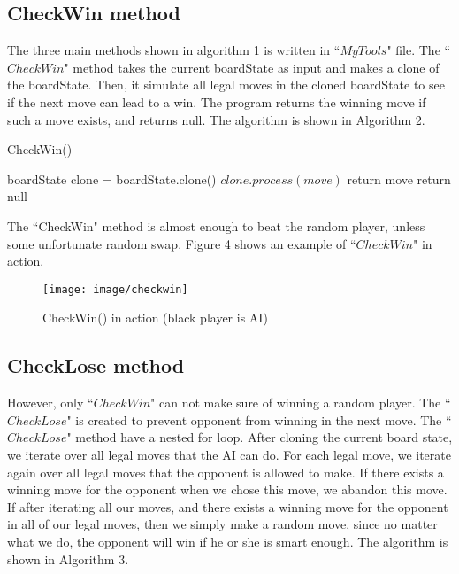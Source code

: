 \documentclass[a4paper,titlepage]{article}
\begin{document}
\subsection{\small{CheckWin method}}
The three main methods shown in algorithm 1 is written in ``$MyTools$" file. The ``$CheckWin$" method takes the current boardState as input and makes a clone of the boardState. Then, it simulate all legal moves in the cloned boardState to see if the next move can lead to a win. The program returns the winning move if such a move exists, and returns null. The algorithm is shown in Algorithm 2.

\begin{algorithm}[H]
    \begin{algorithmic}[1]
    \small
        \caption{CheckWin()} \label{algorithm: win}
        \Require boardState
        \State clone = boardState.clone()
        \State $clone.process(move)$
        \State return move
        \EndIf
        \EndFor
        \State return null
        \end{algorithmic}
\end{algorithm}

The ``CheckWin" method is almost enough to beat the random player, unless some unfortunate random swap. Figure 4 shows an example of ``$CheckWin$" in action.

\begin{figure}[!htb]
  \centering
  \texttt{[image: image/checkwin]}
  \caption{CheckWin() in action (black player is AI)}
\end{figure}


\subsection{\small{CheckLose method}}
However, only ``$CheckWin$" can not make sure of winning a random player. The ``$CheckLose$" is created to prevent opponent from winning in the next move. The ``$CheckLose$" method have a nested for loop. After cloning the current board state, we iterate over all legal moves that the AI can do. For each legal move, we iterate again over all legal moves that the opponent is allowed to make. If there exists a winning move for the opponent when we chose this move, we abandon this move. If after iterating all our moves, and there exists a winning move for the opponent in all of our legal moves, then we simply make a random move, since no matter what we do, the opponent will win if he or she is smart enough. The algorithm is shown in Algorithm 3.
\end{document}
